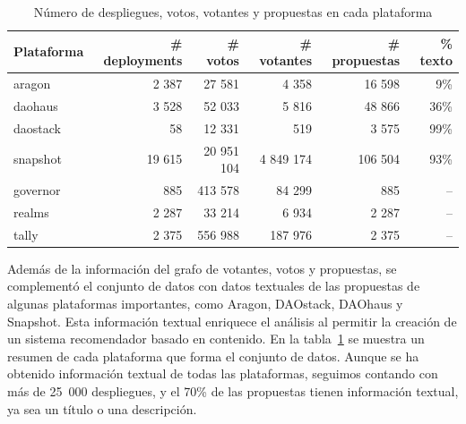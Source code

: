 \begin{table}[b]
    \centering
    \small
    \begin{tabular}{l|rrrrr}
        \toprule
        Plataforma &
        \# deployments &
        \# votos &
        \# votantes &
        \# propuestas &
        \% texto \\
        \midrule
        aragon & 2 387 & 27 581 & 4 358 & 16 598 & 9\% \\
        daohaus & 3 528 & 52 033 & 5 816 & 48 866 & 36\% \\
        daostack & 58 & 12 331 & 519 & 3 575 & 99\% \\
        snapshot & 19 615 & 20 951 104 & 4 849 174 & 106 504 & 93\% \\ \hline
        governor & 885 & 413 578 & 84 299 & 885 & -- \\
        realms & 2 287 & 33 214 & 6 934 & 2 287 & -- \\
        tally & 2 375 & 556 988 & 187 976 & 2 375 & -- \\
        \bottomrule
    \end{tabular}
    \caption{Número de despliegues, votos, votantes y propuestas en cada plataforma}
    \label{tab:4_daos_por_plataforma}
\end{table}

Además de la información del grafo de votantes, votos y propuestas, se complementó el conjunto de datos con datos textuales de las propuestas de algunas plataformas importantes, como Aragon, DAOstack, DAOhaus y Snapshot. Esta información textual enriquece el análisis al permitir la creación de un sistema recomendador basado en contenido. En la tabla~\ref{tab:4_daos_por_plataforma} se muestra un resumen de cada plataforma que forma el conjunto de datos. Aunque se ha obtenido información textual de todas las plataformas, seguimos contando con más de 25~000 despliegues, y el 70\% de las propuestas tienen información textual, ya sea un título o una descripción.

